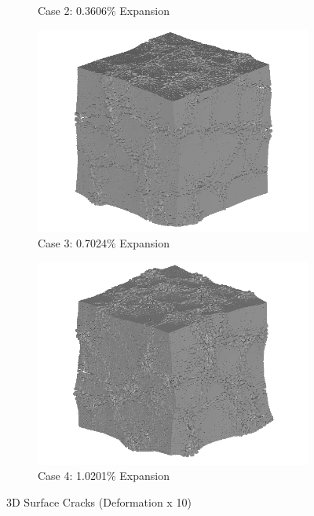 \begin{figure}[!h]
\begin{subfigure}{.5\textwidth}
    \caption{Case 2: 0.3606\% Expansion}
    \end{subfigure}%
    \begin{subfigure}{.5\textwidth}
      \centering
      \includegraphics[width=.8\linewidth]{Files/exp_3D/ASR/A30P25_3_3d.png}
    \caption{Case 3: 0.7024\% Expansion}
    \end{subfigure}
    \begin{subfigure}{.5\textwidth}
      \centering
      \includegraphics[width=.8\linewidth]{Files/exp_3D/ASR/A30P25_4_3d.png}
    \caption{Case 4: 1.0201\% Expansion}
    \end{subfigure}%


  \caption{3D Surface Cracks (Deformation x 10)}
  \label{fig:ASR_A30P25_3D}
\end{figure}

